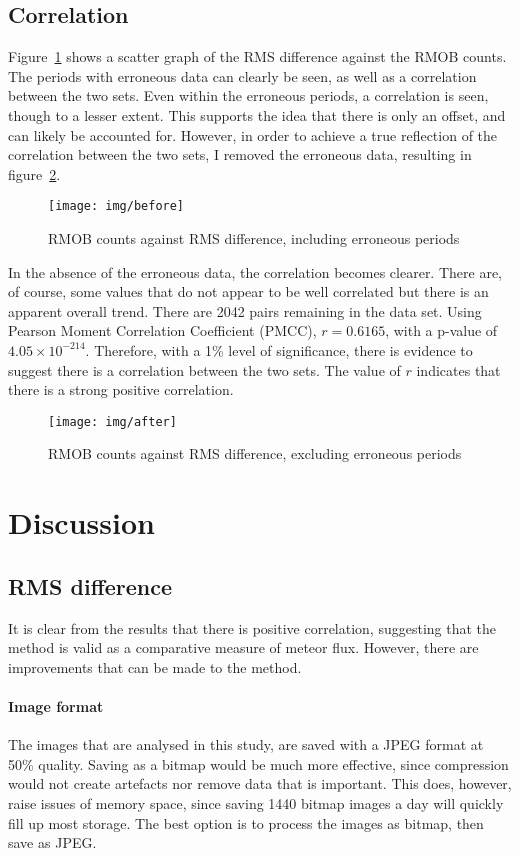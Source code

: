 \subsection{Correlation}
Figure~\ref{fig:img:before} shows a scatter graph of the RMS difference against the RMOB counts. The periods with erroneous data can clearly be seen, as well as a correlation between the two sets. Even within the erroneous periods, a correlation is seen, though to a lesser extent. This supports the idea that there is only an offset, and can likely be accounted for. However, in order to achieve a true reflection of the correlation between the two sets, I removed the erroneous data, resulting in figure~\ref{fig:img:after}.
\begin{figure}[h!]
	\centering
	\texttt{[image: img/before]}
	\caption{RMOB counts against RMS difference, including erroneous periods
		\label{fig:img:before}}
\end{figure}
In the absence of the erroneous data, the correlation becomes clearer. There are, of course, some values that do not appear to be well correlated but there is an apparent overall trend. There are 2042 pairs remaining in the data set. Using Pearson Moment Correlation Coefficient (PMCC), $r = 0.6165$, with a p-value of $4.05 \times 10^{-214}$. Therefore, with a 1\% level of significance, there is evidence to suggest there is a correlation between the two sets. The value of $r$ indicates that there is a strong positive correlation.
\begin{figure}[h!]
	\centering
	\texttt{[image: img/after]}
	\caption{RMOB counts against RMS difference, excluding erroneous periods
		\label{fig:img:after}}
\end{figure}

\section{Discussion}
\subsection{RMS difference}
It is clear from the results that there is positive correlation, suggesting that the method is valid as a comparative measure of meteor flux. However, there are improvements that can be made to the method.
\paragraph{Image format\\}
The images that are analysed in this study, are saved with a JPEG format at 50\% quality. Saving as a bitmap would be much more effective, since compression would not create artefacts nor remove data that is important. This does, however, raise issues of memory space, since saving 1440 bitmap images a day will quickly fill up most storage. The best option is to process the images as bitmap, then save as JPEG.

